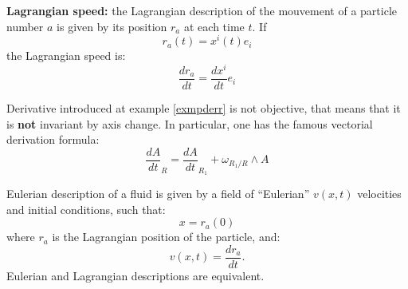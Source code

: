 \documentclass[12pt]{book}
\begin{document}
\begin{exmp}\label{exmpderr}{\bf Lagrangian speed:} the Lagrangian
description of the mouvement of a particle number $a$ is given by its position
$r_a$ at each time $t$. If
\begin{equation}
r_a(t)=x^i(t)e_i
\end{equation}
the Lagrangian speed is:
\begin{equation}
\frac{dr_a}{dt}=\frac{dx^i}{dt}e_i
\end{equation}
\end{exmp}
Derivative introduced at example \ref{exmpderr} is not
objective, that means that it is {\bf not} invariant by axis change. In particular,
one has the famous vectorial derivation formula:
\begin{equation}\label{eqvectderfor}
\frac{dA}{dt}_R=\frac{dA}{dt}_{R_1}+\omega_{R_1/R}\wedge A
\end{equation}

\begin{exmp}
Eulerian description of a fluid is given by a field of ``Eulerian'' $v(x,t)$
velocities and initial conditions, such that:
\begin{equation}
x=r_a(0)
\end{equation}
where $r_a$ is the Lagrangian position of the particle, and:
\begin{equation}
v(x,t)=\frac{dr_a}{dt}.
\end{equation}
Eulerian and Lagrangian descriptions are equivalent. 
\end{exmp}
\end{document}
